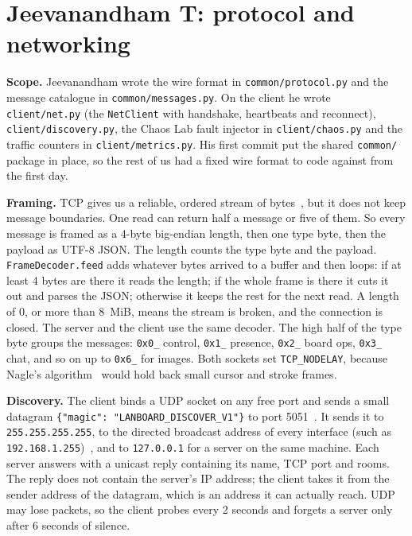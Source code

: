 \documentclass[11pt,a4paper]{article}
\newcommand{\file}[1]{\texttt{#1}}
\begin{document}
\section{Jeevanandham T: protocol and networking}

\textbf{Scope.} Jeevanandham wrote the wire format in \file{common/protocol.py} and the
message catalogue in \file{common/messages.py}. On the client he wrote \file{client/net.py} (the
\file{NetClient} with handshake, heartbeats and reconnect), \file{client/discovery.py}, the Chaos
Lab fault injector in \file{client/chaos.py} and the traffic counters in \file{client/metrics.py}.
His first commit put the shared \file{common/} package in place, so the rest of us had a fixed
wire format to code against from the first day.

\textbf{Framing.} TCP gives us a reliable, ordered stream of bytes~\cite{rfc793,rfc9293}, but it
does not keep message boundaries. One read can return half a message or five of them. So every
message is framed as a 4-byte big-endian length, then one type byte, then the payload as UTF-8
JSON. The length counts the type byte and the payload. \file{FrameDecoder.feed} adds whatever
bytes arrived to a buffer and then loops: if at least 4 bytes are there it reads the length; if
the whole frame is there it cuts it out and parses the JSON; otherwise it keeps the rest for the
next read. A length of 0, or more than 8~MiB, means the stream is broken, and the connection is
closed. The server and the client use the same decoder. The high half of the type byte groups the
messages: \texttt{0x0\_} control, \texttt{0x1\_} presence, \texttt{0x2\_} board ops,
\texttt{0x3\_} chat, and so on up to \texttt{0x6\_} for images. Both sockets set
\texttt{TCP\_NODELAY}, because Nagle's algorithm~\cite{rfc896} would hold back small cursor and
stroke frames.

\textbf{Discovery.} The client binds a UDP socket on any free port and sends a small datagram
\texttt{\{"magic": "LANBOARD\_DISCOVER\_V1"\}} to port 5051~\cite{rfc768}. It sends it to
\texttt{255.255.255.255}, to the directed broadcast address of every interface (such as
\texttt{192.168.1.255})~\cite{rfc919}, and to \texttt{127.0.0.1} for a server on the same
machine. Each server answers with a unicast reply containing its name, TCP port and rooms. The
reply does not contain the server's IP address; the client takes it from the sender address of
the datagram, which is an address it can actually reach. UDP may lose packets, so the client
probes every 2 seconds and forgets a server only after 6 seconds of silence.
\end{document}
